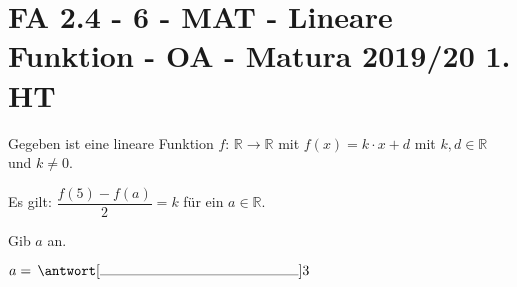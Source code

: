 \section{FA 2.4 - 6 - MAT - Lineare Funktion - OA - Matura 2019/20 1. HT}

\begin{beispiel}[FA 2.4]{1}
Gegeben ist eine lineare Funktion $f$: $\mathbb{R}\rightarrow\mathbb{R}$ mit $f(x)=k\cdot x+d$ mit $k,d\in\mathbb{R}$ und $k\neq 0$.

Es gilt: $\dfrac{f(5)-f(a)}{2}=k$ für ein $a\in\mathbb{R}$.

Gib $a$ an.\leer

$a=\,\antwort[\rule{5cm}{0.3pt}]{3}$
\end{beispiel}